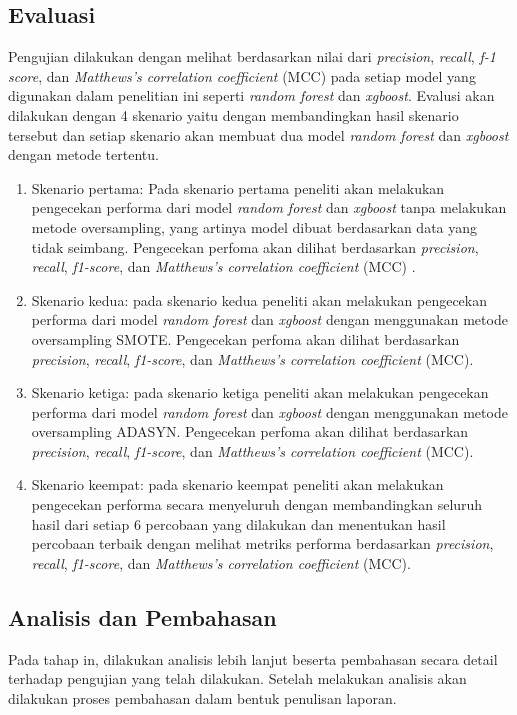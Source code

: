 \subsection{Evaluasi}
Pengujian dilakukan dengan melihat berdasarkan nilai dari  \textit{precision}, \textit{recall}, \textit{f-1 score}, dan \textit{Matthews’s correlation coefficient} (MCC) pada setiap model yang digunakan dalam penelitian ini seperti \textit{random forest} dan \textit{xgboost}. Evalusi akan dilakukan dengan 4 skenario yaitu dengan membandingkan  hasil skenario tersebut dan setiap skenario akan membuat dua model \textit{random forest} dan \textit{xgboost} dengan metode tertentu.
\begin{enumerate}[noitemsep]
    \item Skenario pertama: Pada skenario pertama peneliti akan melakukan pengecekan performa dari model \textit{random forest} dan \textit{xgboost} tanpa melakukan metode oversampling, yang artinya model dibuat berdasarkan data yang tidak seimbang. Pengecekan perfoma akan dilihat berdasarkan \textit{precision}, \textit{recall},     \textit{f1-score}, dan \textit{Matthews’s correlation coefficient} (MCC) .
    \item Skenario kedua: pada skenario kedua peneliti akan melakukan pengecekan performa dari model \textit{random forest} dan \textit{xgboost} dengan menggunakan metode oversampling SMOTE. Pengecekan perfoma akan dilihat berdasarkan \textit{precision}, \textit{recall},    \textit{f1-score}, dan \textit{Matthews’s correlation coefficient} (MCC).
    \item Skenario ketiga: pada skenario ketiga peneliti akan melakukan pengecekan performa dari model \textit{random forest} dan \textit{xgboost} dengan menggunakan metode oversampling ADASYN. Pengecekan perfoma akan dilihat berdasarkan \textit{precision}, \textit{recall}, \textit{f1-score}, dan \textit{Matthews’s correlation coefficient} (MCC).
    \item Skenario keempat: pada skenario keempat peneliti akan melakukan pengecekan performa secara menyeluruh dengan membandingkan seluruh hasil dari setiap 6 percobaan yang dilakukan dan menentukan hasil percobaan terbaik dengan melihat metriks performa berdasarkan \textit{precision}, \textit{recall}, \textit{f1-score}, dan \textit{Matthews’s correlation coefficient} (MCC).
\end{enumerate}
\subsection{Analisis dan Pembahasan}
Pada tahap in, dilakukan analisis lebih lanjut beserta pembahasan secara detail terhadap pengujian yang telah dilakukan. Setelah melakukan analisis akan dilakukan proses pembahasan dalam bentuk penulisan laporan.


